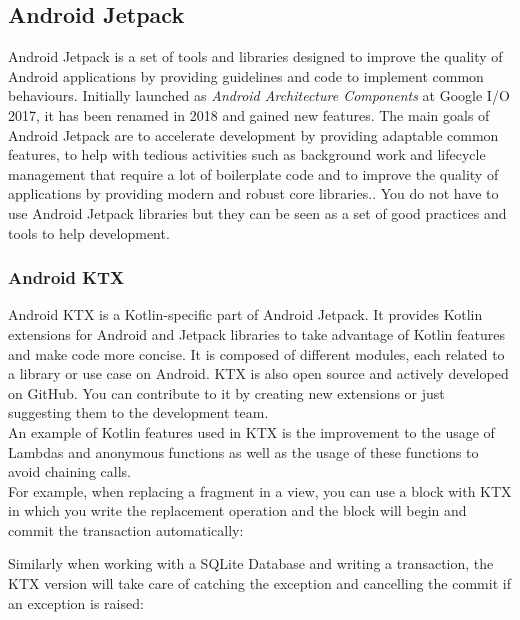 \documentclass[11pt,a4paper]{report}
\begin{document}
\subsection{Android Jetpack}
Android Jetpack is a set of tools and libraries designed to improve the quality of Android applications by providing guidelines and code to implement common behaviours. Initially launched as \emph{Android Architecture Components} at Google I/O 2017, it has been renamed in 2018 and gained new features. The main goals of Android Jetpack are to accelerate development by providing adaptable common features, to help with tedious activities such as background work and lifecycle management that require a lot of boilerplate code\cite{wiki:define:boilerplate} and to improve the quality of applications by providing modern and robust core libraries.\cite{android:doc:jetpack}. You do not have to use Android Jetpack libraries but they can be seen as a set of good practices and tools to help development.
\subsubsection{Android KTX}
\label{ktx_section}
Android KTX is a Kotlin-specific part of Android Jetpack. It provides Kotlin extensions for Android and Jetpack libraries to take advantage of Kotlin features and make code more concise\cite{android:doc:ktx}. It is composed of different modules, each related to a library or use case on Android. KTX is also open source and actively developed on GitHub\cite{github:android:ktx}. You can contribute to it by creating new extensions or just suggesting them to the development team.\\

An example of Kotlin features used in KTX is the improvement to the usage of Lambdas and anonymous functions as well as the usage of these functions to avoid chaining calls.\\

For example, when replacing a fragment in a view, you can use a block with KTX in which you write the replacement operation and the block will begin and commit the transaction automatically:

Similarly when working with a SQLite Database and writing a transaction, the KTX version will take care of catching the exception and cancelling the commit if an exception is raised:
\end{document}
